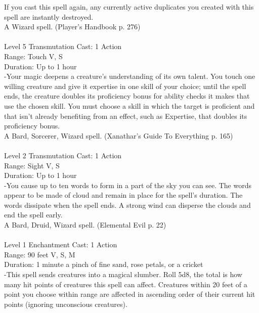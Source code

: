 \documentclass[10pt,twocolumn]{report}
\begin{document}
If you cast this spell again, any currently active duplicates you created with this spell are instantly destroyed.\\
A Wizard spell. (Player's Handbook p. 276) \\


 \\
Level 5 \quad Transmutation \quad Cast: 1 Action\\
Range: Touch \quad V, S\\
Duration: Up to 1 hour \quad \\
-Your magic deepens a creature’s understanding of its own talent. You touch one willing creature and give it expertise in one skill of your choice; until the spell ends, the creature doubles its proficiency bonus for ability checks it makes that use the chosen skill.
You must choose a skill in which the target is proficient and that isn’t already benefiting from an effect, such as Expertise, that doubles its proficiency bonus.\\
A Bard, Sorcerer, Wizard spell. (Xanathar's Guide To Everything p. 165) \\


 \\
Level 2 \quad Transmutation \quad Cast: 1 Action\\
Range: Sight \quad V, S\\
Duration: Up to 1 hour \quad \\
-You cause up to ten words to form in a part of the sky you can see. The words appear to be made of cloud and remain in place for the spell’s duration. The words dissipate when the spell ends. A strong wind can disperse the clouds and end the spell early.\\
A Bard, Druid, Wizard spell. (Elemental Evil p. 22) \\


 \\
Level 1 \quad Enchantment \quad Cast: 1 Action\\
Range: 90 feet \quad V, S, M\\
Duration: 1 minute \quad a pinch of fine sand, rose petals, or a cricket\\
-This spell sends creatures into a magical slumber. Roll 5d8, the total is how many hit points of creatures this spell can affect. Creatures within 20 feet of a point you choose within range are affected in ascending order of their current hit points (ignoring unconscious creatures).
\end{document}
